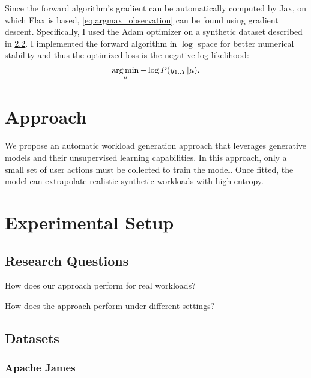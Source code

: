 Since the forward algorithm's gradient can be automatically computed by Jax\cite{Bradbury2018-jz}, on which Flax is based, \cref{eq:argmax_observation} can be found using gradient descent. Specifically, I used the Adam\cite{Kingma2014-jj} optimizer on a synthetic dataset described in \cref{sec:dataset}. I implemented the forward algorithm in \(\log\) space for better numerical stability and thus the optimized loss is the negative log-likelihood:
\begin{equation}
    \label{eq:neg_log_likelihood}
    \operatorname*{arg\,min}_{\mu} - \log P(y_{1..T} | \mu).
\end{equation}

\section{Approach}\label{sec:approach}

We propose an automatic workload generation approach that leverages generative models and their unsupervised learning capabilities. In this approach, only a small set of user actions must be collected to train the model. Once fitted, the model can extrapolate realistic synthetic workloads with high entropy.

\section{Experimental Setup}\label{sec:experimental_setup}

\subsection{Research Questions}

\begin{researchquestions}
    \item\label{rq:performance} How does our approach perform for real workloads?
    \item\label{rq:ablation} How does the approach perform under different settings?
\end{researchquestions}

\subsection{Datasets}\label{sec:dataset}

\subsubsection{Apache James}


